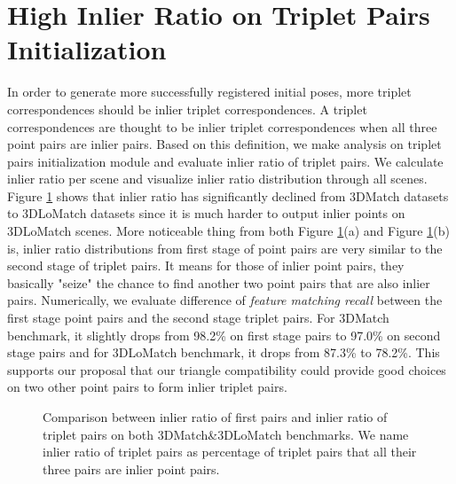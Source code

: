 \documentclass[conference,compsoc]{IEEEtran}
\begin{document}
\section{High Inlier Ratio on Triplet Pairs Initialization}
In order to generate more successfully registered initial poses, more triplet correspondences should be inlier triplet correspondences. A triplet correspondences are thought to be inlier triplet correspondences when all three point pairs are inlier pairs. Based on this definition, we make analysis on triplet pairs initialization module and evaluate inlier ratio of triplet pairs. 
We calculate inlier ratio per scene and visualize inlier ratio distribution through all scenes. Figure \ref{fig:triplet inlier} shows that inlier ratio has significantly declined from 3DMatch datasets to 3DLoMatch datasets since it is much harder to output inlier points on 3DLoMatch scenes. More noticeable thing from both Figure \ref{fig:triplet inlier}(a) and Figure \ref{fig:triplet inlier}(b) is, inlier ratio distributions from first stage of point pairs are very similar to the second stage of triplet pairs. It means for those of inlier point pairs, they basically "seize" the chance to find another two point pairs that are also inlier pairs. Numerically, we evaluate difference of \emph{feature matching recall} between the first stage point pairs and the second stage triplet pairs. For 3DMatch benchmark, it slightly drops from 98.2\% on first stage pairs to 97.0\% on second stage pairs and for 3DLoMatch benchmark, it drops from 87.3\% to 78.2\%. This supports our proposal that  our triangle compatibility could provide good choices on two other point pairs to form inlier triplet pairs.
\begin{figure}%
   \centering
   \hfill
   \caption{Comparison between inlier ratio of first pairs and inlier ratio of triplet pairs on both 3DMatch\&3DLoMatch benchmarks. We name inlier ratio of triplet pairs as percentage of triplet pairs that all their three pairs are inlier point pairs.}%
   \label{fig:triplet inlier}%
\end{figure}
\end{document}
